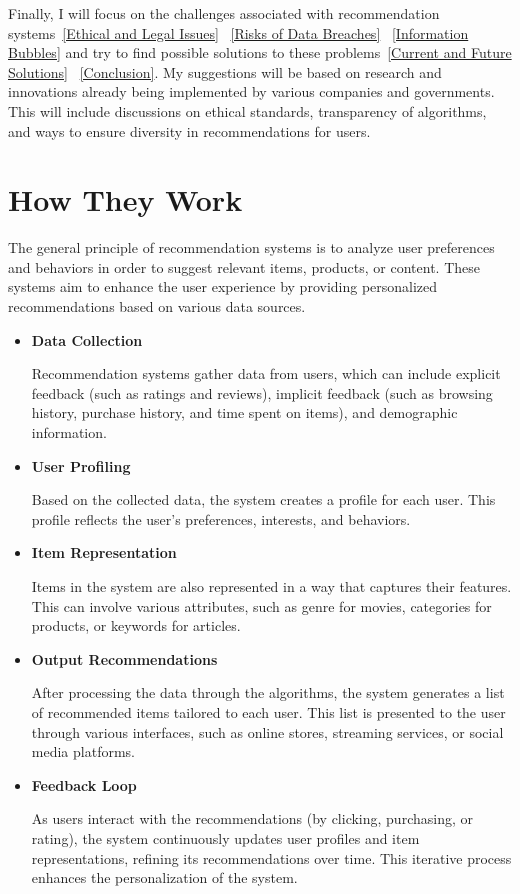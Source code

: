 \documentclass[10pt,twoside,slovak,a4paper]{article}
\begin{document}
Finally, I will focus on the challenges associated with recommendation systems~\ref{Ethical and Legal Issues} ~\ref{Risks of Data Breaches} ~\ref{Information Bubbles} and try to find possible solutions to these problems~\ref{Current and Future Solutions} ~\ref{Conclusion}. My suggestions will be based on research and innovations already being implemented by various companies and governments. This will include discussions on ethical standards, transparency of algorithms, and ways to ensure diversity in recommendations for users.
\newline
\newline
\newline



\section{How They Work} \label{How They Work}
The general principle of recommendation systems is to analyze user preferences and behaviors in order to suggest relevant items, products, or content. These systems aim to enhance the user experience by providing personalized recommendations based on various data sources.

\begin{itemize}
\item \textbf{Data Collection}

Recommendation systems gather data from users, which can include explicit feedback (such as ratings and reviews), implicit feedback (such as browsing history, purchase history, and time spent on items), and demographic information.
\item \textbf{User Profiling}

Based on the collected data, the system creates a profile for each user. This profile reflects the user’s preferences, interests, and behaviors.
\item \textbf{Item Representation}

 Items in the system are also represented in a way that captures their features. This can involve various attributes, such as genre for movies, categories for products, or keywords for articles.
\item \textbf{Output Recommendations}

 After processing the data through the algorithms, the system generates a list of recommended items tailored to each user. This list is presented to the user through various interfaces, such as online stores, streaming services, or social media platforms.
 \item \textbf{Feedback Loop}
 
 As users interact with the recommendations (by clicking, purchasing, or rating), the system continuously updates user profiles and item representations, refining its recommendations over time. This iterative process enhances the personalization of the system.
\end{itemize}
\end{document}
